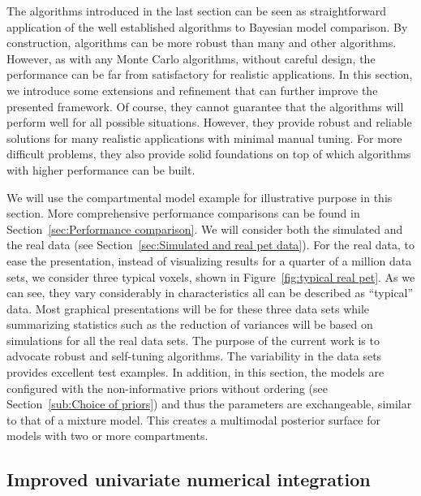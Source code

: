 The algorithms introduced in the last section can be seen as straightforward application of the well established \smc algorithms to Bayesian model comparison. By construction, \smc algorithms can be more robust than many \mcmc and other algorithms. However, as with any Monte Carlo algorithms, without careful design, the performance can be far from satisfactory for realistic applications. In this section, we introduce some extensions and refinement that can further improve the presented framework. Of course, they cannot guarantee that the algorithms will perform well for all possible situations. However, they provide robust and reliable solutions for many realistic applications with minimal manual tuning. For more difficult problems, they also provide solid foundations on top of which algorithms with higher performance can be built.

We will use the \pet compartmental model example for illustrative purpose in this section. More comprehensive performance comparisons can be found in Section~\ref{sec:Performance comparison}. We will consider both the simulated and the real data (see Section~\ref{sec:Simulated and real pet data}). For the real data, to ease the presentation, instead of visualizing results for a quarter of a million data sets, we consider three typical voxels, shown in Figure~\ref{fig:typical real pet}. As we can see, they vary considerably in characteristics  all can be described as ``typical'' \pet data. Most graphical presentations will be for these three data sets while summarizing statistics such as the reduction of variances will be based on simulations for all the real data sets. The purpose of the current work is to advocate robust and self-tuning algorithms. The variability in the data sets provides excellent test examples. In addition, in this section, the models are configured with the non-informative priors without ordering (see Section~\ref{sub:Choice of priors}) and thus the parameters are exchangeable, similar to that of a mixture model. This creates a multimodal posterior surface for models with two or more compartments.



\subsection{Improved univariate numerical integration}
\label{sub:Improved univariate numerical integration}

